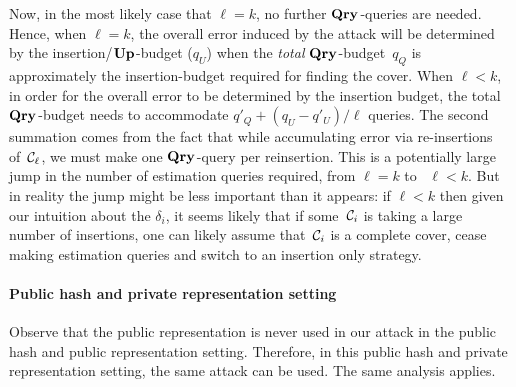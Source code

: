 Now, in the most likely case that $\ell=k$, no further $\textup{\textbf{Qry}}\hspace{0.5pt}$-queries are needed. Hence, when $\ell=k$, the overall error induced by the attack will be determined by the insertion/$\textup{\textbf{Up}}\hspace{0.5pt}$-budget ($q_U$) when the \emph{total} $\textup{\textbf{Qry}}\hspace{0.5pt}$-budget~$q_Q$ is approximately the insertion-budget required for finding the cover.   When $\ell < k$, in order for the overall error to be determined by the insertion budget, the total $\textup{\textbf{Qry}}\hspace{0.5pt}$-budget needs to accommodate $q'_Q + (q_U - q'_U)/\ell$ queries. The second summation comes from the fact that while accumulating error via re-insertions of~$\mathcal{C}_\ell$, we must make one $\textup{\textbf{Qry}}\hspace{0.5pt}$-query per reinsertion.  
%
This is a potentially large jump in the number of estimation queries required, from $\ell=k$ to \ $\ell<k$.  But in reality the jump might be less important than it appears: if $\ell < k$ then given our intuition about the $\delta_i$, it seems likely that if some~$\mathcal{C}_i$ is taking a large number of insertions, one can likely assume that~$\mathcal{C}_i$ is a complete cover, cease making estimation queries and switch to an insertion only strategy.


 \paragraph{Public hash and private representation setting}
Observe that the public representation is never used in our attack in the public hash and public representation setting. Therefore, in this public hash and private representation setting, the same attack can be used. The same analysis applies.

